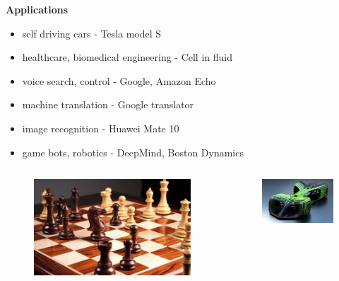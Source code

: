 \documentclass[xcolor=dvipsnames]{beamer}
\begin{document}
\begin{frame}{\bf Applications}

\begin{itemize}
  \item self driving cars - Tesla model S
  \item healthcare, biomedical engineering - Cell in fluid
  \item voice search, control - Google, Amazon Echo
  \item machine translation - Google translator
  \item image recognition - Huawei Mate 10
  \item game bots, robotics - DeepMind, Boston Dynamics
\end{itemize}

\begin{columns}

    \begin{column}{0.33\textwidth}

      \begin{figure}
        \includegraphics[scale=0.03]{../../pictures/chess.jpg}
      \end{figure}

    \end{column}

    \begin{column}{0.33\textwidth}  %

      \begin{figure}
      \includegraphics[scale=0.15]{../../pictures/nvidia_car.jpg}
      \end{figure}


\end{column}
\end{columns}
\end{frame}
\end{document}
